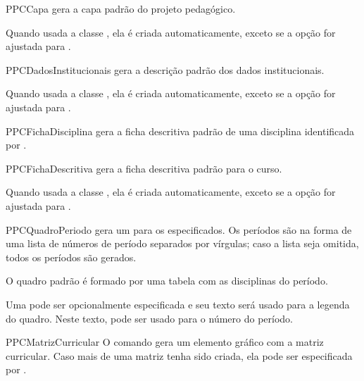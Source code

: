 \documentclass[a4paper, 11pt]{article}
\begin{document}
\begin{Macrodef}{PPCCapa}{}{}
     gera a capa padrão do projeto pedagógico.

    Quando usada a classe , ela é criada automaticamente, exceto se a opção  for ajustada para .
\end{Macrodef}

\begin{Macrodef}{PPCDadosInstitucionais}{}{}
     gera a descrição padrão dos dados institucionais.

    Quando usada a classe , ela é criada automaticamente, exceto se a opção  for ajustada para .
\end{Macrodef}

\begin{Macrodef}{PPCFichaDisciplina}{}{}
     gera a ficha descritiva padrão de uma disciplina identificada por .
\end{Macrodef}


\begin{Macrodef}{PPCFichaDescritiva}{}{}
     gera a ficha descritiva padrão para o curso.

    Quando usada a classe , ela é criada automaticamente, exceto se a opção  for ajustada para .
\end{Macrodef}


\begin{Macrodef}{PPCQuadroPeriodo}{}{}
     gera um  para os  especificados. Os períodos são na forma de uma lista de números de período separados por vírgulas; caso a lista seja omitida, todos os períodos são gerados.

    O quadro padrão é formado por uma tabela com as disciplinas do período.

    Uma  pode ser opcionalmente especificada e seu texto será usado para a legenda do quadro. Neste texto,  pode ser usado para o número do período.
\end{Macrodef}

\begin{Macrodef}{PPCMatrizCurricular}{}{}
    O comando  gera um elemento gráfico com a matriz curricular. Caso mais de uma matriz tenha sido criada, ela pode ser especificada por .
\end{Macrodef}
\end{document}
